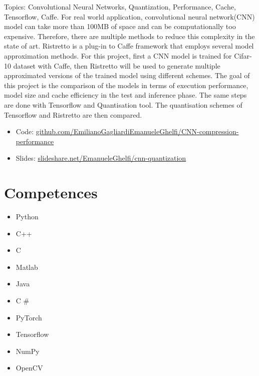 \documentclass[11pt,a4paper,sans]{moderncv} %
\begin{document}
{
Topics: Convolutional Neural Networks, Quantization, Performance, Cache, Tensorflow, Caffe. 
\newline{}
For real world application, convolutional neural network(CNN) model can take more than 100MB of space and can be computationally too expensive. Therefore, there are multiple methods to reduce this complexity in the state of art. Ristretto is a plug-in to Caffe framework that employs several model approximation methods. For this project, first a CNN model is trained for Cifar-10 dataset with Caffe, then Ristretto will be used to generate multiple approximated versions of the trained model using different schemes. The goal of this project is the comparison of the models in terms of execution performance, model size and cache efficiency in the test and inference phase. The same steps are done with Tensorflow and Quantisation tool. The quantisation schemes of Tensorflow and Ristretto are then compared.
\newline{}
\begin{itemize}
	\item Code: \href{https://github.com/EmilianoGagliardiEmanueleGhelfi/CNN-compression-performance}{github.com/EmilianoGagliardiEmanueleGhelfi/CNN-compression-performance}
	\item Slides: \href{https://www.slideshare.net/EmanueleGhelfi/cnn-quantization}{slideshare.net/EmanueleGhelfi/cnn-quantization}
\end{itemize}
}



\section{Competences}

{
\begin{itemize}
\item Python
\item C++
\item C
\item Matlab
\item Java
\item C \#
\end{itemize}
}
{
\begin{itemize}
\item PyTorch
\item Tensorflow
\end{itemize}
}
{
\begin{itemize}
\item NumPy
\item OpenCV
\end{itemize}
}
\end{document}
